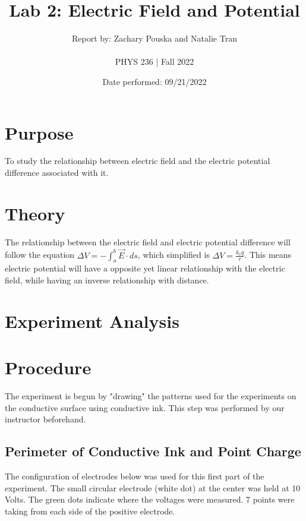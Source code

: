 \documentclass[titlepage]{article}
\begin{document}
\title{\textbf{Lab 2: Electric Field and Potential}}
\author{Report by: Zachary Pouska and  Natalie Tran \\ \\ 
PHYS 236 | Fall 2022}
\date{Date performed: 09/21/2022}

	\maketitle
	\section{Purpose}
	To study the relationship between electric field and the electric potential difference associated with it.
	\section{Theory}	
	The relationship between the electric field and electric potential difference will follow the equation \(\Delta V = -\int_{a}^{b} \vec{E} \cdot ds\), which simplified is \(\Delta V = \frac{k_{e}q}{r}\). This means electric potential will have a opposite yet linear relationship with the electric field, while having an inverse relationship with distance.
	\section{Experiment Analysis}
	\section{Procedure}
    The experiment is begun by "drawing" the patterns used for the experiments on the conductive surface using conductive ink. This step was performed by our instructor beforehand. 
    \subsection{Perimeter of Conductive Ink and Point Charge}
    The configuration of electrodes below was used for this first part of the experiment. The small circular electrode (white dot) at the center was held at 10 Volts. The green dots indicate where the voltages were measured. 7 points were taking from each side of the positive electrode.
\end{document}
